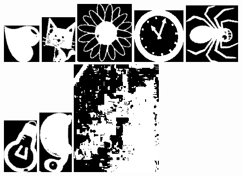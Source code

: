 \documentclass[10pt,a4paper]{article}
\begin{document}
\begin{center}
\includegraphics[scale=0.25]{2.3/sign20.jpg}
\includegraphics[scale=0.25]{2.3/sign21.jpg}
\includegraphics[scale=0.25]{2.3/sign22.jpg}
\includegraphics[scale=0.25]{2.3/sign23.jpg}
\includegraphics[scale=0.25]{2.3/sign24.jpg}
\includegraphics[scale=0.25]{2.3/sign25.jpg}
\includegraphics[scale=0.25]{2.3/sign26.jpg}
\includegraphics[scale=0.25]{2.3/sign30.jpg}

\end{center}
\end{document}
